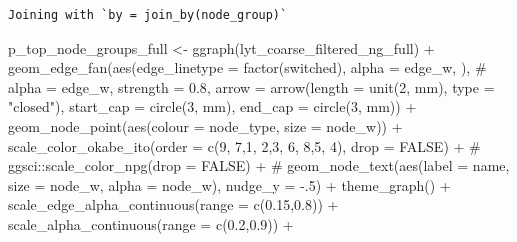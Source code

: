 \documentclass[
  letterpaper,
  DIV=11,
  numbers=noendperiod]{scrartcl}
\newenvironment{Shaded}{\begin{snugshade}}{\end{snugshade}}
\newcommand{\AttributeTok}[1]{\textcolor[rgb]{0.40,0.45,0.13}{#1}}
\newcommand{\CommentTok}[1]{\textcolor[rgb]{0.37,0.37,0.37}{#1}}
\newcommand{\ConstantTok}[1]{\textcolor[rgb]{0.56,0.35,0.01}{#1}}
\newcommand{\DecValTok}[1]{\textcolor[rgb]{0.68,0.00,0.00}{#1}}
\newcommand{\FloatTok}[1]{\textcolor[rgb]{0.68,0.00,0.00}{#1}}
\newcommand{\FunctionTok}[1]{\textcolor[rgb]{0.28,0.35,0.67}{#1}}
\newcommand{\NormalTok}[1]{\textcolor[rgb]{0.00,0.23,0.31}{#1}}
\newcommand{\OtherTok}[1]{\textcolor[rgb]{0.00,0.23,0.31}{#1}}
\newcommand{\SpecialCharTok}[1]{\textcolor[rgb]{0.37,0.37,0.37}{#1}}
\newcommand{\StringTok}[1]{\textcolor[rgb]{0.13,0.47,0.30}{#1}}
\begin{document}
\begin{verbatim}
Joining with `by = join_by(node_group)`
\end{verbatim}

\begin{Shaded}
\begin{Highlighting}[]
\NormalTok{p\_top\_node\_groups\_full }\OtherTok{\textless{}{-}} \FunctionTok{ggraph}\NormalTok{(lyt\_coarse\_filtered\_ng\_full) }\SpecialCharTok{+}
    \FunctionTok{geom\_edge\_fan}\NormalTok{(}\FunctionTok{aes}\NormalTok{(}\AttributeTok{edge\_linetype =} \FunctionTok{factor}\NormalTok{(switched), }\AttributeTok{alpha =}\NormalTok{ edge\_w, ), }\CommentTok{\# alpha = edge\_w, }
                  \AttributeTok{strength =} \FloatTok{0.8}\NormalTok{,}
                  \AttributeTok{arrow =} \FunctionTok{arrow}\NormalTok{(}\AttributeTok{length =} \FunctionTok{unit}\NormalTok{(}\DecValTok{2}\NormalTok{, }\StringTok{\textquotesingle{}mm\textquotesingle{}}\NormalTok{), }\AttributeTok{type =} \StringTok{"closed"}\NormalTok{),}
                  \AttributeTok{start\_cap =} \FunctionTok{circle}\NormalTok{(}\DecValTok{3}\NormalTok{, }\StringTok{\textquotesingle{}mm\textquotesingle{}}\NormalTok{),}
                  \AttributeTok{end\_cap =} \FunctionTok{circle}\NormalTok{(}\DecValTok{3}\NormalTok{, }\StringTok{\textquotesingle{}mm\textquotesingle{}}\NormalTok{)) }\SpecialCharTok{+}
    \FunctionTok{geom\_node\_point}\NormalTok{(}\FunctionTok{aes}\NormalTok{(}\AttributeTok{colour =}\NormalTok{ node\_type, }\AttributeTok{size =}\NormalTok{ node\_w)) }\SpecialCharTok{+}
    \FunctionTok{scale\_color\_okabe\_ito}\NormalTok{(}\AttributeTok{order =} \FunctionTok{c}\NormalTok{(}\DecValTok{9}\NormalTok{, }\DecValTok{7}\NormalTok{,}\DecValTok{1}\NormalTok{, }\DecValTok{2}\NormalTok{,}\DecValTok{3}\NormalTok{, }\DecValTok{6}\NormalTok{, }\DecValTok{8}\NormalTok{,}\DecValTok{5}\NormalTok{, }\DecValTok{4}\NormalTok{), }\AttributeTok{drop =} \ConstantTok{FALSE}\NormalTok{) }\SpecialCharTok{+}
        \CommentTok{\# ggsci::scale\_color\_npg(drop = FALSE) +}
        \CommentTok{\# geom\_node\_text(aes(label = name, size = node\_w, alpha = node\_w), nudge\_y = {-}.5) +}
        \FunctionTok{theme\_graph}\NormalTok{() }\SpecialCharTok{+}
        \FunctionTok{scale\_edge\_alpha\_continuous}\NormalTok{(}\AttributeTok{range =} \FunctionTok{c}\NormalTok{(}\FloatTok{0.15}\NormalTok{,}\FloatTok{0.8}\NormalTok{)) }\SpecialCharTok{+}
        \FunctionTok{scale\_alpha\_continuous}\NormalTok{(}\AttributeTok{range =} \FunctionTok{c}\NormalTok{(}\FloatTok{0.2}\NormalTok{,}\FloatTok{0.9}\NormalTok{)) }\SpecialCharTok{+}

\end{Highlighting}
\end{Shaded}
\end{document}
